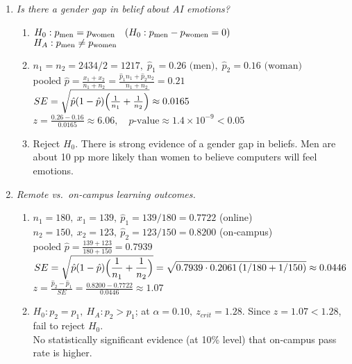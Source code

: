 \documentclass{article}
\begin{document}
\begin{enumerate}
\item \emph{Is there a gender gap in belief about AI emotions?}
\begin{enumerate}[label=(\alph*)]
  \item
    $H_0: p_{\rm men}=p_{\rm women}\quad(H_0:p_{\rm men}-p_{\rm women}=0)$\\
    $H_A: p_{\rm men}\neq p_{\rm women}$
  \item
    $n_1=n_2=2434/2=1217,\;\hat p_1=0.26 \text{ (men)},\;\hat p_2=0.16\text{ (woman)}$\\
    pooled $\displaystyle \hat p=\frac{x_1+x_2}{n_1+n_2}=\frac{\hat p_1n_1+\hat p_2n_2}{n_1+n_2}=0.21$\\
    $SE=\sqrt{\hat p(1-\hat p)\Bigl(\frac1{n_1}+\frac1{n_2}\Bigr)}\approx0.0165$\\
    $z=\frac{0.26-0.16}{0.0165}\approx6.06,\quad p\text{-value}\approx1.4\times10^{-9}<0.05\,$
  \item
    Reject $H_0$.  There is strong evidence of a gender gap in beliefs.  Men are about 10 pp more likely than women to believe computers will feel emotions.
\end{enumerate}

\item \emph{Remote vs.\ on‑campus learning outcomes.}
\begin{enumerate}[label=(\alph*)]
  \item
    $n_1=180,\ x_1=139,\ \hat p_1=139/180=0.7722$ (online)\\
    $n_2=150,\ x_2=123,\ \hat p_2=123/150=0.8200$ (on‑campus)\\
    pooled $\displaystyle \hat p=\frac{139+123}{180+150}=0.7939$\\
    $\displaystyle SE=\sqrt{\hat p(1-\hat p)\Bigl(\frac1{n_1}+\frac1{n_2}\Bigr)}
      =\sqrt{0.7939\cdot0.2061\,(1/180+1/150)}\approx0.0446$\\
    $\displaystyle z=\frac{\hat p_2-\hat p_1}{SE}=\frac{0.8200-0.7722}{0.0446}\approx1.07$
  \item
    $H_0:p_2=p_1,\ H_A:p_2>p_1$; at $\alpha=0.10,\ z_{crit}=1.28$.  Since $z=1.07<1.28$, fail to reject $H_0$.\\
    No statistically significant evidence (at 10\% level) that on‑campus pass rate is higher.
\end{enumerate}


\end{enumerate}
\end{document}

